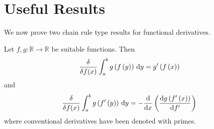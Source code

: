 \section{Useful Results}
We now prove two chain rule type results for functional derivatives.
\begin{theorem}
  \label{theorem:chain_rules}
  Let $f,g\colon\mathbb{R}\rightarrow\mathbb{R}$ be suitable functions. Then
  \begin{equation}
    \label{eq:chain_rule_functionals}
    \fdv{f(x)} \int_a^b g\left(f\left(y\right)\right)\,\mathrm{d}y = g'\left(f\left(x\right)\right)
  \end{equation}
  and
  \begin{equation}
    \label{eq:chain_rule_derivatives_functional}
    \fdv{f(x)} \int_a^b g\left(f'\left(y\right)\right)\,\mathrm{d}y = -\dv{x}\left(\dv{g\left(f'\left(x\right)\right)}{f'}\right)
  \end{equation}
  where conventional derivatives have been denoted with primes.
\end{theorem}
